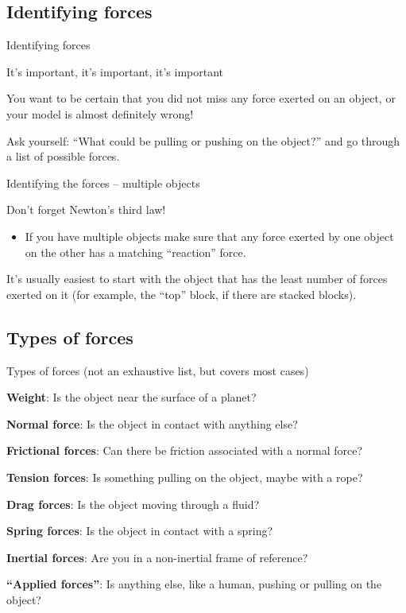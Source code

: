 \documentclass[aspectratio=169,
hyperref={colorlinks,urlcolor=blue}
]{beamer}
\begin{document}
\subsection{Identifying forces}
\label{subsec:identifyingforces}
\begin{bulletframe}{Identifying forces}
\item It’s important, it’s important, it’s important
\item You want to be certain that you did not miss any force exerted on an object, or your model is almost definitely wrong!
\item Ask yourself: ``What could be pulling or pushing on the object?'' and go through a list of possible forces.
\end{bulletframe}


\begin{bulletframe}{Identifying the forces – multiple objects}
\item Don’t forget Newton’s third law!
\begin{itemize}
\item  If you have multiple objects make sure that any force exerted by one object on the other has a matching ``reaction'' force.
\end{itemize}
\item It’s usually easiest to start with the object that has the least number of forces exerted on it (for example, the ``top'' block, if there are stacked blocks).
\end{bulletframe}




\subsection{Types of forces}
\label{subsec:typesofforces}
\begin{bulletframe}{Types of forces (not an exhaustive list, but covers most cases)}
\item \textbf{Weight}: Is the object near the surface of a planet?
\item \textbf{Normal force}: Is the object in contact with anything else?
\item \textbf{Frictional forces}: Can there be friction associated with a normal force?
\item \textbf{Tension forces}: Is something pulling on the object, maybe with a rope?
\item \textbf{Drag forces}: Is the object moving through a fluid?
\item \textbf{Spring forces}: Is the object in contact with a spring?
\item \textbf{Inertial forces}: Are you in a non-inertial frame of reference?
\item \textbf{``Applied forces''}: Is anything else, like a human, pushing or pulling on the object?
\end{bulletframe}
\end{document}
